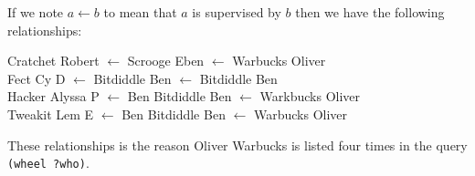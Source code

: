 \documentclass[a4paper,12pt]{article}
\begin{document}
If we note $a \leftarrow b$ to mean that $a$ is supervised by $b$ then
we have the following relationships:

\medskip\noindent
Cratchet Robert $\leftarrow$ Scrooge Eben $\leftarrow$ Warbucks Oliver \\
Fect Cy D $\leftarrow$ Bitdiddle Ben $\leftarrow$ Bitdiddle Ben \\
Hacker Alyssa P $\leftarrow$ Ben Bitdiddle Ben $\leftarrow$ Warkbucks
Oliver \\
Tweakit Lem E $\leftarrow$ Ben Bitdiddle Ben $\leftarrow$ Warbucks
Oliver

\medskip These relationships is the reason Oliver Warbucks is listed
four times in the query \lstinline!(wheel ?who)!.
\end{document}
